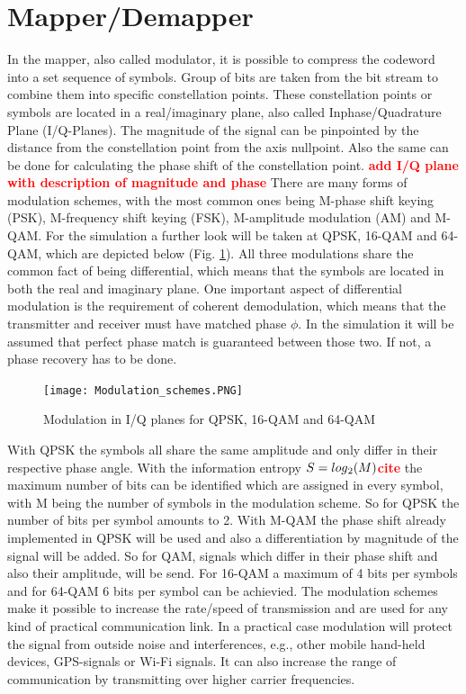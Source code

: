\documentclass[12pt,oneside, reqno]{report}
\newcommand\boldred[1]{\textcolor{red}{\textbf{#1}}}
\begin{document}
\section{Mapper/Demapper}
\label{sec:mod}
In the mapper, also called modulator, it is possible to compress the codeword into a set sequence of symbols. Group of bits are taken from the bit stream to combine them into specific constellation points. These constellation points or symbols are located in a real/imaginary plane, also called Inphase/Quadrature Plane (I/Q-Planes). The magnitude of the signal can be pinpointed by the distance from the constellation point from the axis nullpoint. Also the same can be done for calculating the phase shift of the constellation point. 
\newline
\boldred{add I/Q plane with description of magnitude and phase}
\newline
There are many forms of modulation schemes, with the most common ones being M-phase shift keying (PSK), M-frequency shift keying (FSK), M-amplitude modulation (AM) and M-\gls{QAM}. For the simulation a further look will be taken at \gls{QPSK}, 16-\gls{QAM} and 64-\gls{QAM}, which are depicted below (Fig. \ref{fig:Modulation}). All three modulations share the common fact of being differential, which means that the symbols are located in both the real and imaginary plane. One important aspect of differential modulation is the requirement of coherent demodulation, which means that the transmitter and receiver must have matched phase $\phi$. In the simulation it will be assumed that perfect phase match is guaranteed between those two. If not, a phase recovery has to be done.  

\begin{figure}[H]
	\centering
	\texttt{[image: Modulation\_schemes.PNG]}
	\caption{Modulation in I/Q planes for QPSK, 16-QAM and 64-QAM}
	\label{fig:Modulation}
\end{figure}

With \gls{QPSK} the symbols all share the same amplitude and only differ in their respective phase angle. With the information entropy $S = log\textsubscript{2}(M)$\boldred{cite} the maximum number of bits can be identified which are assigned in every symbol, with M being the number of symbols in the modulation scheme. So for \gls{QPSK} the number of bits per symbol amounts to 2.
\newline
With M-\gls{QAM}  the phase shift  already implemented in \gls{QPSK} will be used and also a differentiation by magnitude of the signal will be added. So for \gls{QAM}, signals which differ in their phase shift and also their amplitude, will be send.  For 16-\gls{QAM} a maximum of 4 bits per symbols and for 64-\gls{QAM} 6 bits per symbol can be achievied.
\newline
The modulation schemes make it possible to increase the rate/speed of transmission and are used for any kind of practical communication link. In a practical case modulation will protect the signal from outside noise and interferences, e.g., other mobile hand-held devices, GPS-signals or Wi-Fi signals. It can also increase the range of communication by transmitting over higher carrier frequencies. 
\end{document}
